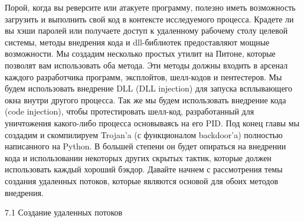 \documentclass[12pt]{book}
\begin{document}
Порой, когда вы реверсите или атакуете программу, полезно иметь возможность загрузить и выполнить свой код в контексте исследуемого процесса. Крадете ли вы хэши паролей или получаете доступ к удаленному рабочему столу целевой системы, методы внедрения кода и dll-библиотек предоставляют мощные возможности. Мы создадим несколько простых утилит на Питоне, которые позволят вам использовать оба метода. Эти методы должны входить в арсенал каждого разработчика программ, эксплойтов, шелл-кодов и пентестеров. Мы будем использовать внедрение DLL (DLL injection) для запуска всплывающего окна внутри другого процесса. Так же мы будем использовать внедрение кода (code injection), чтобы протестировать шелл-код, разработанный для уничтожения какого-либо процесса основываясь на его PID. Под конец главы мы создадим и скомпилируем Trojan’a (с функционалом backdoor’a) полностью написанного на Python. В большей степени он будет опираться на внедрении кода и использовании некоторых других скрытых тактик, которые должен использовать каждый хороший бэкдор. Давайте начнем с рассмотрения темы создания удаленных потоков, которые являются основой для обоих методов внедрения.


7.1 Создание удаленных потоков
\end{document}

